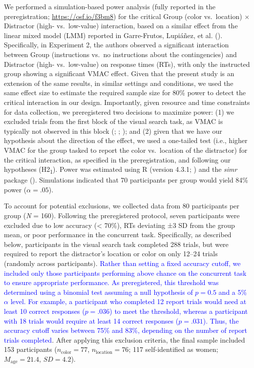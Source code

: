 \documentclass[
  man,
  floatsintext,
  longtable,
  nolmodern,
  notxfonts,
  notimes,
  mask,
  colorlinks=true,linkcolor=blue,citecolor=blue,urlcolor=blue]{apa7}
\begin{document}
We performed a simulation-based power analysis (fully reported in the
preregistration; \url{https://osf.io/f3bm8}) for the critical Group
(color vs.~location) \(\times\) Distractor (high- vs.~low-value)
interaction, based on a similar effect from the linear mixed model (LMM)
reported in Garre-Frutos, Lupiáñez, et al.
(). Specifically, in Experiment 2,
the authors observed a significant interaction between Group
(instructions vs.~no instructions about the contingencies) and
Distractor (high- vs.~low-value) on response times (RTs), with only the
instructed group showing a significant VMAC effect. Given that the
present study is an extension of the same results, in similar settings
and conditions, we used the same effect size to estimate the required
sample size for 80\% power to detect the critical interaction in our
design. Importantly, given resource and time constraints for data
collection, we preregistered two decisions to maximize power: (1) we
excluded trials from the first block of the visual search task, as VMAC
is typically not observed in this block
(;
;
);
and (2) given that we have our hypothesis about the direction of the
effect, we used a one-tailed test (i.e., higher VMAC for the group
tasked to report the color vs.~location of the distractor) for the
critical interaction, as specified in the preregistration, and following
our hypotheses (H2\textsubscript{1}). Power was estimated using R
(version 4.3.1; ) and the
\emph{simr} package ().
Simulations indicated that 70 participants per group would yield 84\%
power (\(\alpha = .05\)).

To account for potential exclusions, we collected data from 80
participants per group (\emph{N} = 160). Following the preregistered
protocol, seven participants were excluded due to low accuracy
(\textless{} 70\%), RTs deviating ±3 SD from the group mean, or poor
performance in the concurrent task. Specifically, as described below,
participants in the visual search task completed 288 trials, but were
required to report the distractor's location or color on only 12--24
trials (randomly across participants). \textcolor{blue}{Rather than
setting a fixed accuracy cutoff, we included only those participants
performing above chance on the concurrent task to ensure appropriate
performance. As preregistered, this threshold was determined using a
binomial test assuming a null hypothesis of \(p = 0.5\) and a 5\%
\(\alpha\) level. For example, a participant who completed 12 report
trials would need at least 10 correct responses (\(p = .036\)) to meet
the threshold, whereas a participant with 18 trials would require at
least 14 correct responses (\(p = .031\)). Thus, the accuracy cutoff
varies between 75\% and 83\%, depending on the number of report trials
completed}. After applying this exclusion criteria, the final sample
included 153 participants (\(n_{\text{color}} = 77\),
\(n_{\text{location}} = 76\); 117 self-identified as women;
\(M_{\text{age}} = 21.4\), \(SD = 4.2\)).
\end{document}

